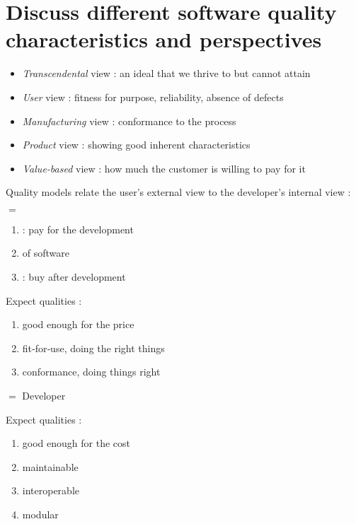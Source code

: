 \section{Discuss different software quality characteristics and perspectives}

\begin{itemize}
    \item \textit{Transcendental} view : an ideal that we thrive to but cannot attain
    \item \textit{User} view : fitness for purpose, reliability, absence of defects
    \item \textit{Manufacturing} view : conformance to the process
    \item \textit{Product} view : showing good inherent characteristics
    \item \textit{Value-based} view : how much the customer is willing to pay for it
\end{itemize}

Quality models relate the user's external view to the developer's internal view :

\begin{minipage}[t]{0.48\textwidth}
     $=$
    \begin{enumerate}
        \item {} : pay for the development
        \item {} of software
        \item {} : buy  after development
    \end{enumerate}
    Expect  qualities : 
    \begin{enumerate}
        \item good enough for the price
        \item fit‐for‐use, doing the right things
        \item conformance, doing things right
    \end{enumerate}
\end{minipage}
\hfill
\begin{minipage}[t]{0.48\textwidth}
     $=$ Developer
    
    Expect  qualities : 
    \begin{enumerate}
        \item good enough for the cost
        \item maintainable
        \item interoperable
        \item modular
    \end{enumerate}
\end{minipage}

